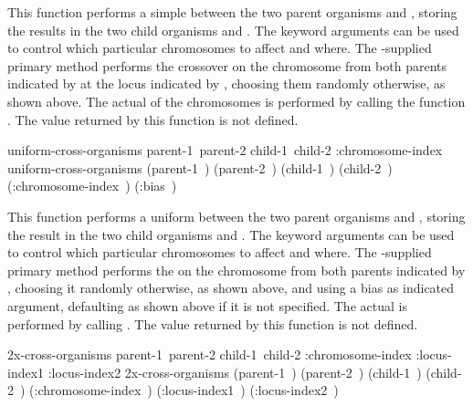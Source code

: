 {{This function performs a simple  between the two parent
organisms  and , storing the results in the two child
organisms  and . The keyword arguments can be used to
control which particular chromosomes to affect and where. The \geco-supplied primary
method performs the crossover on the chromosome from both parents indicated by
 at the locus indicated by , choosing them
randomly otherwise, as shown above. The actual  of the chromosomes is
performed by calling the function .
The value returned by this function is not defined.
\par}%

\filbreak
{\samepage
\Defgeneric uniform-cross-organisms {\hbox{parent-1 parent-2} \hbox{child-1 child-2}
                             \key :chromosome-index}
 uniform-cross-organisms {\hbox{(parent-1 )} \hbox{(parent-2 )}
                                    \hbox{(child-1 )} \hbox{(child-2 )} \key
    \hbox{(:chromosome-index )}
    \hbox{(:bias )}}

This function performs a uniform 
\cite{ga:uniform-xover,ga:parameterized-uniform-xover,ga:davis-handbook} between the
two parent organisms  and , storing the result in the
two child organisms  and . The keyword arguments can be
used to control which particular chromosomes to affect and where. The \geco-supplied
primary method performs the  on the chromosome from both parents indicated
by , choosing it randomly otherwise, as shown above, and
using a bias as indicated  argument, defaulting as shown above if it is
not specified. The actual  is performed by calling
.
The value returned by this function is not defined.
\par}%

\filbreak
{\samepage
\Defgeneric 2x-cross-organisms {\hbox{parent-1 parent-2} \hbox{child-1 child-2}
                             \key :chromosome-index :locus-index1 :locus-index2}
 2x-cross-organisms {\hbox{(parent-1 )} \hbox{(parent-2 )}
                                    \hbox{(child-1 )} \hbox{(child-2 )}
 \key
    \hbox{(:chromosome-index )}
    \hbox{(:locus-index1 )}
    \hbox{(:locus-index2 )}}
 
}}
